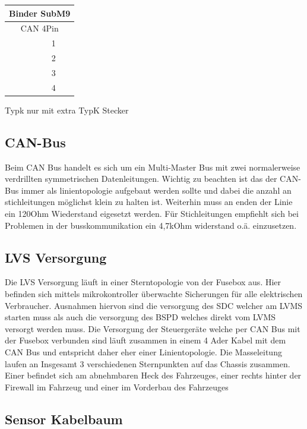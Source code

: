 \begin{tabularx}{6cm}{|X|c|}
	\hline
	\multicolumn{2}{|c|}{\textbf{Binder SubM9}} \\
	\hline
	\multicolumn{2}{|c|}{\cellcolor{black!30} CAN 4Pin} \\
	\hline
	\cellcolor{brown!30} \centering{GND} & 1 \\
	\hline
	\cellcolor{green!30} \centering{CANH} & 2 \\
	\hline
	\cellcolor{white!30} \centering{24V} & 3 \\
	\hline
	\cellcolor{yellow!30} \centering{CANL} & 4 \\
	\hline
\end{tabularx}



Typk nur mit extra TypK Stecker

\subsection{CAN-Bus}
Beim CAN Bus handelt es sich um ein Multi-Master Bus mit zwei normalerweise verdrillten symmetrischen Datenleitungen. Wichtig zu beachten ist das der CAN-Bus immer als linientopologie aufgebaut werden sollte und dabei die anzahl an stichleitungen möglichst klein zu halten ist. Weiterhin muss an enden der Linie ein 120Ohm Wiederstand eigesetzt werden. Für Stichleitungen empfiehlt sich bei Problemen in der busskommunikation ein 4,7kOhm widerstand o.ä. einzusetzen.

\subsection{LVS Versorgung}

Die LVS Versorgung läuft in einer Sterntopologie von der Fusebox aus. Hier befinden sich mittels mikrokontroller überwachte Sicherungen für alle elektrischen Verbraucher. Ausnahmen hiervon sind die versorgung des SDC welcher am LVMS starten muss als auch die versorgung des BSPD welches direkt vom LVMS versorgt werden muss. Die Versorgung der Steuergeräte welche per CAN Bus mit der Fusebox verbunden sind läuft zusammen in einem 4 Ader Kabel mit dem CAN Bus und entspricht daher eher einer Linientopologie. Die Masseleitung laufen an Insgesamt 3 verschiedenen Sternpunkten auf das Chassis zusammen. Einer befindet sich am abnehmbaren Heck des Fahrzeuges, einer rechts hinter der Firewall im Fahrzeug und einer im Vorderbau des Fahrzeuges

\subsection{Sensor Kabelbaum}


